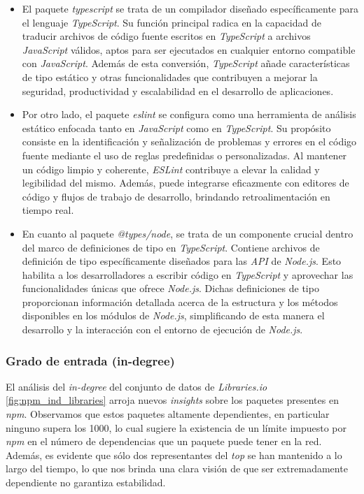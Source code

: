 \begin{itemize}
    \item El paquete \textit{typescript} se trata de un compilador diseñado específicamente para el
          lenguaje \textit{TypeScript}. Su función principal radica en la capacidad de traducir archivos de código fuente
          escritos en \textit{TypeScript} a archivos \textit{JavaScript} válidos, aptos para ser ejecutados en cualquier
          entorno compatible con \textit{JavaScript}. Además de esta conversión, \textit{TypeScript} añade características
          de tipo estático y otras funcionalidades que contribuyen a mejorar la seguridad, productividad y escalabilidad
          en el desarrollo de aplicaciones.

    \item Por otro lado, el paquete \textit{eslint} se configura como una herramienta de análisis estático
          enfocada tanto en \textit{JavaScript} como en \textit{TypeScript}. Su propósito consiste en la identificación y
          señalización de problemas y errores en el código fuente mediante el uso de reglas predefinidas o personalizadas.
          Al mantener un código limpio y coherente, \textit{ESLint} contribuye a elevar la calidad y legibilidad del mismo.
          Además, puede integrarse eficazmente con editores de código y flujos de trabajo de desarrollo, brindando retroalimentación
          en tiempo real.

    \item En cuanto al paquete \textit{@types/node}, se trata de un componente crucial dentro del marco de
          definiciones de tipo en \textit{TypeScript}. Contiene archivos de definición de tipo específicamente diseñados para
          las \textit{API} de \textit{Node.js}. Esto habilita a los desarrolladores a escribir código en \textit{TypeScript}
          y aprovechar las funcionalidades únicas que ofrece \textit{Node.js}. Dichas definiciones de tipo proporcionan
          información detallada acerca de la estructura y los métodos disponibles en los módulos de \textit{Node.js},
          simplificando de esta manera el desarrollo y la interacción con el entorno de ejecución de \textit{Node.js}.
\end{itemize}

\subsubsection{Grado de entrada (in-degree)}

El análisis del \emph{in-degree} del conjunto de datos de \emph{Libraries.io} \ref{fig:npm_ind_libraries} arroja nuevos \emph{insights} sobre
los paquetes presentes en \emph{npm}. Observamos que estos paquetes altamente dependientes, en particular ninguno
supera los 1000, lo cual sugiere la existencia de un límite impuesto por \emph{npm} en el número de dependencias que un
paquete puede tener en la red. Además, es evidente que sólo dos representantes del \emph{top} se han mantenido a lo largo
del tiempo, lo que nos brinda una clara visión de que ser extremadamente dependiente no garantiza estabilidad.

